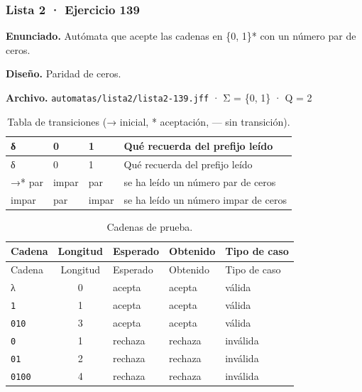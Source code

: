 
\hypertarget{lista-2-ejercicio-139}{%
\subsubsection{Lista 2 · Ejercicio 139}\label{lista-2-ejercicio-139}}

\textbf{Enunciado.} Autómata que acepte las cadenas en \{0, 1\}* con un número par de ceros.

\textbf{Diseño.} Paridad de ceros.

\textbf{Archivo.} \texttt{automatas/lista2/lista2-139.jff} · Σ = \{0, 1\} · \textbar Q\textbar{} = 2

\begin{longtable}[]{@{}llll@{}}
\caption{Tabla de transiciones (→ inicial, * aceptación, --- sin transición).}\tabularnewline
\toprule\noalign{}
δ & 0 & 1 & Qué recuerda del prefijo leído \\
\midrule\noalign{}
\endfirsthead
\toprule\noalign{}
δ & 0 & 1 & Qué recuerda del prefijo leído \\
\midrule\noalign{}
\endhead
\bottomrule\noalign{}
\endlastfoot
→* par & impar & par & se ha leído un número par de ceros \\
impar & par & impar & se ha leído un número impar de ceros \\
\end{longtable}

\begin{longtable}[]{@{}lclll@{}}
\caption{Cadenas de prueba.}\tabularnewline
\toprule\noalign{}
Cadena & Longitud & Esperado & Obtenido & Tipo de caso \\
\midrule\noalign{}
\endfirsthead
\toprule\noalign{}
Cadena & Longitud & Esperado & Obtenido & Tipo de caso \\
\midrule\noalign{}
\endhead
\bottomrule\noalign{}
\endlastfoot
λ & 0 & acepta & acepta & válida \\
\texttt{1} & 1 & acepta & acepta & válida \\
\texttt{010} & 3 & acepta & acepta & válida \\
\texttt{0} & 1 & rechaza & rechaza & inválida \\
\texttt{01} & 2 & rechaza & rechaza & inválida \\
\texttt{0100} & 4 & rechaza & rechaza & inválida \\
\end{longtable}

